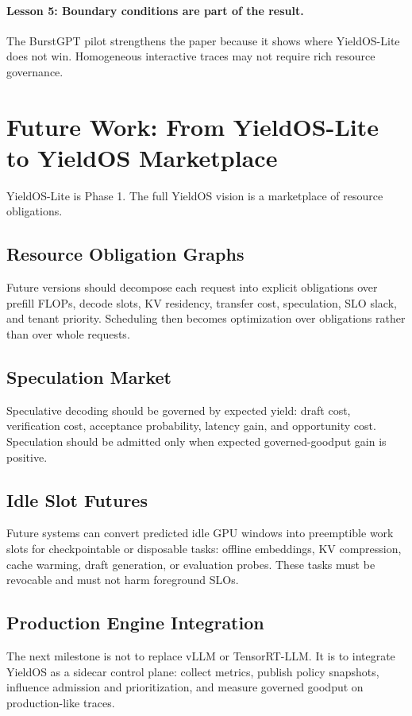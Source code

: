 \documentclass[11pt]{article}
\begin{document}
\paragraph{Lesson 5: Boundary conditions are part of the result.}
The BurstGPT pilot strengthens the paper because it shows where YieldOS-Lite does not win. Homogeneous interactive traces may not require rich resource governance.

\section{Future Work: From YieldOS-Lite to YieldOS Marketplace}

YieldOS-Lite is Phase 1. The full YieldOS vision is a marketplace of resource obligations.

\subsection{Resource Obligation Graphs}
Future versions should decompose each request into explicit obligations over prefill FLOPs, decode slots, KV residency, transfer cost, speculation, SLO slack, and tenant priority. Scheduling then becomes optimization over obligations rather than over whole requests.

\subsection{Speculation Market}
Speculative decoding should be governed by expected yield: draft cost, verification cost, acceptance probability, latency gain, and opportunity cost. Speculation should be admitted only when expected governed-goodput gain is positive.

\subsection{Idle Slot Futures}
Future systems can convert predicted idle GPU windows into preemptible work slots for checkpointable or disposable tasks: offline embeddings, KV compression, cache warming, draft generation, or evaluation probes. These tasks must be revocable and must not harm foreground SLOs.

\subsection{Production Engine Integration}
The next milestone is not to replace vLLM or TensorRT-LLM. It is to integrate YieldOS as a sidecar control plane: collect metrics, publish policy snapshots, influence admission and prioritization, and measure governed goodput on production-like traces.
\end{document}
